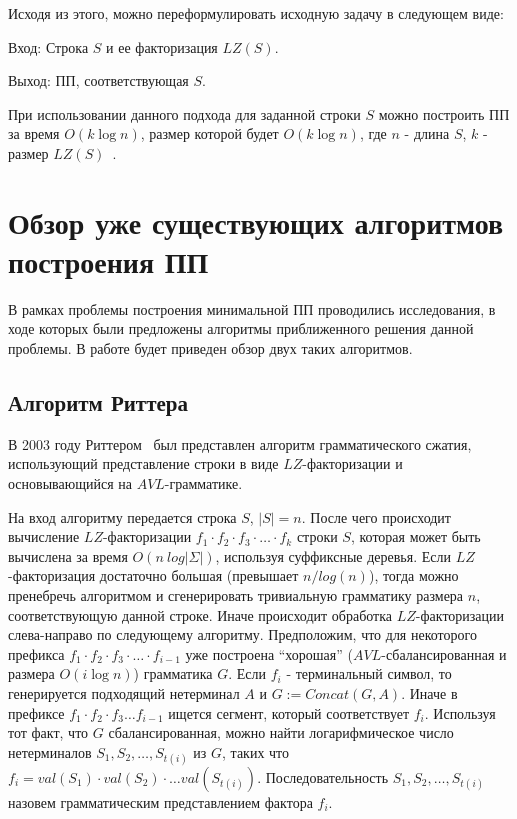 \documentclass[12pt,a4paper]{extarticle}
\theoremstyle{break}
\begin{document}
Исходя из этого, можно переформулировать исходную задачу в следующем виде: 

Вход: Строка $S$ и ее факторизация $LZ(S)$.

Выход: ПП, соответствующая $S$.

При использовании данного подхода для заданной строки $S$ можно построить ПП за
время $O(k\log n)$, размер которой будет $O(k\log n)$, где $n$ - длина $S$,
$k$ - размер $LZ(S)$~\cite{rytter}.

\newpage
\section{Обзор уже существующих алгоритмов построения ПП}
В рамках проблемы построения минимальной ПП проводились исследования, в ходе
которых были предложены алгоритмы приближенного решения данной проблемы. В
работе будет приведен обзор двух таких алгоритмов. 

\subsection{Алгоритм Риттера}
В 2003 году Риттером~\cite{rytter} был представлен алгоритм грамматического сжатия,
использующий представление строки в виде $LZ$-факторизации и
основывающийся на $AVL$-грамматике.

На вход алгоритму передается строка $S$, $|S| = n$. После чего происходит
вычисление $LZ$-факторизации $f_1 \cdot f_2 \cdot f_3 \cdot \ldots \cdot
f_k$ строки $S$, которая может быть вычислена за время $O(n\
log|\Sigma|)$, используя суффиксные деревья. Если $LZ$-факторизация достаточно
большая (превышает $n/log(n)$), тогда можно пренебречь алгоритмом и
сгенерировать тривиальную грамматику размера $n$, соответствующую данной строке.
Иначе происходит обработка $LZ$-факторизации слева-направо по следующему
алгоритму. 
Предположим, что для некоторого префикса $f_1 \cdot f_2 \cdot f_3  \cdot \ldots
 \cdot f_{i-1}$ уже построена ``хорошая'' ($AVL$-сбалансированная и размера $O(i\log n)$)
грамматика $G$. Если $f_i$ - терминальный символ, то генерируется подходящий
нетерминал $A$ и  $G := Concat(G, A)$. Иначе в префиксе $f_1 \cdot f_2 \cdot f_3 \ldots f_{i-1}$ ищется
сегмент, который соответствует $f_i$. Используя тот факт, что $G$ сбалансированная, можно найти
логарифмическое число нетерминалов $S_1, S_2, \ldots, S_{t(i)}$ из $G$, таких
что $f_i = val(S_1) \cdot val(S_2) \cdot \ldots val(S_{t(i)})$.
Последовательность $S_1, S_2, \ldots, S_{t(i)}$ назовем грамматическим
представлением фактора $f_i$.
\end{document}
